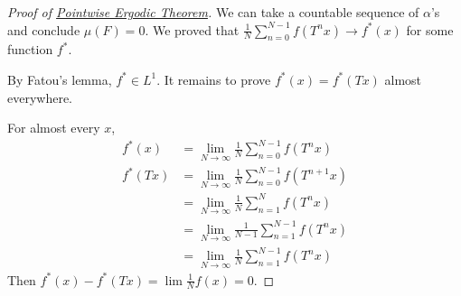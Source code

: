 \documentclass{article}
\begin{document}
\begin{proof}[Proof of \hyperlink{thm:pet}{Pointwise Ergodic Theorem}]
  We can take a countable sequence of $\alpha$'s and conclude $\mu(F) = 0$.
  We proved that $\frac{1}{N} \sum_{n=0}^{N-1} f(T^n x) \to f^*(x)$ for some function $f^*$.

  By Fatou's lemma, $f^* \in L^1$.
  It remains to prove $f^*(x) = f^*(Tx)$ almost everywhere.

  For almost every $x$,
  \begin{align*}
    f^*(x) &= \lim_{N \to \infty} \frac{1}{N} \sum_{n=0}^{N-1} f(T^n x) \\
    f^*(Tx) &= \lim_{N \to \infty} \frac{1}{N} \sum_{n=0}^{N-1} f(T^{n+1} x) \\
     &= \lim_{N \to \infty} \frac{1}{N} \sum_{n=1}^{N} f(T^n x) \\
     &= \lim_{N \to \infty} \frac{1}{N-1} \sum_{n=1}^{N-1} f(T^n x) \\
     &= \lim_{N \to \infty} \frac{1}{N} \sum_{n=1}^{N-1} f(T^n x)
  \end{align*}
  Then $f^*(x) - f^*(Tx) = \lim \frac{1}{N} f(x) = 0$.
\end{proof}
\printindex
\end{document}
